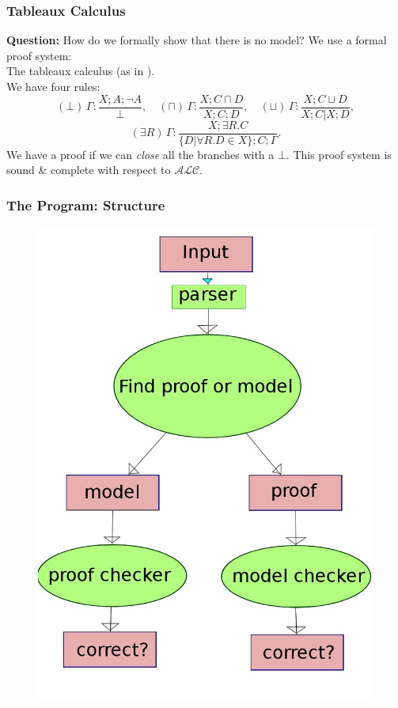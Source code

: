 \begin{frame}
  \frametitle{Tableaux Calculus}
  {\bf Question:} How do we formally show that there is no model?
  \pause
  \bigskip
  We use a formal proof system:\\
  The tableaux calculus (as in \cite{gore07}). \\
  We have four rules:
  \[
  (\bot) \, \Gamma: \frac{X; A; \lnot A}{\bot}, \quad
  (\sqcap) \, \Gamma: \frac{X; C \sqcap D}{X; C; D}, \quad
  (\sqcup) \, \Gamma: \frac{X; C \sqcup D}{X; C | X; D},
  \]
  \[
  (\exists R) \, \Gamma: \frac{X; \exists R. C}{\{D | \forall R.D \in X\};  C ; \Gamma}.
  \]
  \pause
  We have a proof if we can \emph{close} all the branches with a $\bot$.
  \pause
  This proof system is sound \& complete with respect to $\mathcal{ALC}$.
\end{frame}

\begin{frame}
  \frametitle{The Program: Structure}
  \begin{figure}
  \begin{center}
    \includegraphics[scale=0.2]{design.jpeg}
  \end{center}
\end{figure}
\end{frame}

